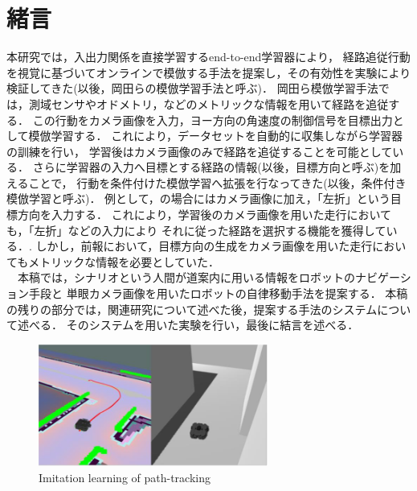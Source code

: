 \documentclass{jarticle}
\begin{document}
\section{緒言}%
本研究では，入出力関係を直接学習するend-to-end学習器により，
経路追従行動を視覚に基づいてオンラインで模倣する手法を提案し，その有効性を実験により検証してきた(以後，岡田らの模倣学習手法と呼ぶ)．\cite{okada1}\cite{okada2}
岡田ら模倣学習手法では，測域センサやオドメトリ，などのメトリックな情報を用いて経路を追従する．
この行動をカメラ画像を入力，ヨー方向の角速度の制御信号を目標出力として模倣学習する．
これにより，データセットを自動的に収集しながら学習器の訓練を行い，
学習後はカメラ画像のみで経路を追従することを可能としている．
さらに学習器の入力へ目標とする経路の情報(以後，目標方向と呼ぶ)を加えることで，
行動を条件付けた模倣学習へ拡張を行なってきた(以後，条件付き模倣学習と呼ぶ)．
例として，の場合にはカメラ画像に加え，「左折」という目標方向を入力する．
これにより，学習後のカメラ画像を用いた走行においても，「左折」などの入力により
それに従った経路を選択する機能を獲得している．\cite{haru}.
しかし，前報において，目標方向の生成をカメラ画像を用いた走行においてもメトリックな情報を必要としていた．
\\　本稿では，シナリオという人間が道案内に用いる情報をロボットのナビゲーション手段と
単眼カメラ画像を用いたロボットの自律移動手法を提案する．
本稿の残りの部分では，関連研究について述べた後，提案する手法のシステムについて述べる．
そのシステムを用いた実験を行い，最後に結言を述べる．
\begin{figure}[h]
  \centering
   \includegraphics[height=40mm]{./figs/path.png}
   \vspace*{-4mm}
   \caption{Imitation learning of path-tracking}
   \label{fig: path}
 \end{figure}
\end{document}
